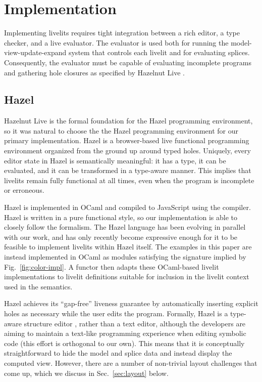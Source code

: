\section{Implementation}\label{sec:implementation}
Implementing livelits requires tight integration between a rich editor, 
a type checker, and a live evaluator. The evaluator is used
both for running the model-view-update-expand system that controls 
each livelit and for evaluating splices. Consequently, 
the evaluator must be capable of evaluating incomplete programs and gathering hole closures
as specified by Hazelnut Live \cite{HazelnutLive}.

\subsection{Hazel}
Hazelnut Live is the formal foundation for the Hazel programming environment, so 
it was natural to choose the the Hazel programming environment for our primary implementation. 
 Hazel is a browser-based live functional programming environment 
organized from the ground up around typed holes. Uniquely, every editor state in Hazel is 
semantically meaningful: it has a type, it can be evaluated, and it can be transformed 
in a type-aware manner. This implies that livelits remain fully functional at all times, 
even when the program is incomplete or erroneous.

Hazel is implemented in OCaml and compiled to JavaScript using the  compiler.
Hazel is written in a pure functional style, so our implementation is able to closely 
follow the formalism. The Hazel language has been evolving in parallel with our work, 
and has only recently become expressive enough for it to be feasible to implement livelits within Hazel itself.
The examples in this paper are instead implemented in OCaml as modules satisfying the signature 
implied by Fig.~\ref{fig:color-impl}. A functor then adapts these OCaml-based livelit implementations 
to livelit definitions suitable for inclusion in the livelit context used in the semantics.

Hazel achieves its ``gap-free'' liveness guarantee by automatically inserting explicit holes as necessary 
while the user edits 
the program. Formally, Hazel is a type-aware structure editor \cite{Hazelnut}, rather than a text editor, 
although the developers are aiming to maintain a text-like programming experience when editing 
symbolic code (this effort is orthogonal to our own). 
This means that it is conceptually straightforward to hide the model and splice data and instead display 
the computed view. However, there are a number of non-trivial layout challenges that come up, which we discuss
in Sec.~\ref{sec:layout} below.

